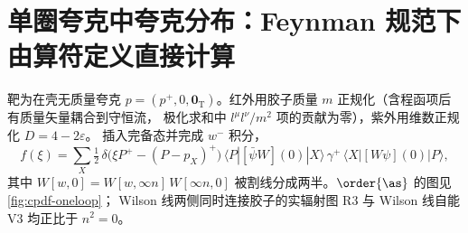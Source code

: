 \section{单圈夸克中夸克分布：Feynman 规范下由算符定义直接计算}\label{sec:cpdf-oneloop}

靶为在壳无质量夸克 $p=(p^+,0,\bm 0_{\mathrm T})$。红外用胶子质量 $m$ 正规化（含程函项后有质量矢量耦合到守恒流，
极化求和中 $l^\mu l^\nu/m^2$ 项的贡献为零），紫外用维数正规化 $D=4-2\varepsilon$。
插入完备态并完成 $w^-$ 积分，
\begin{equation}\label{eq:cpdf-cut}
f(\xi)=\sum_X\tfrac12\,\delta\big(\xi P^+-(P-p_X)^+\big)\,
\langle P|[\bar\psi W](0)|X\rangle\,\gamma^+\,\langle X|[W\psi](0)|P\rangle ,
\end{equation}
其中 $W[w,0]=W[w,\infty n]\,W[\infty n,0]$ 被割线分成两半。$\order{\as}$ 的图见 \cref{fig:cpdf-oneloop}；
Wilson 线两侧同时连接胶子的实辐射图 R3 与 Wilson 线自能 V3 均正比于 $n^2=0$。

